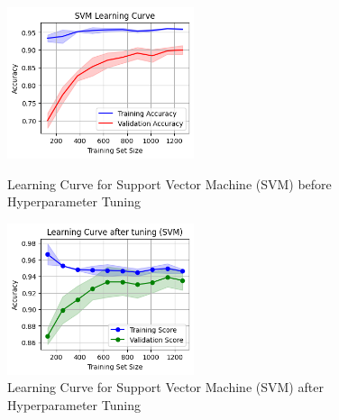 \documentclass[12pt]{report}
\begin{document}
\begin{figure}[H]
	\centering
	\begin{minipage}{0.45\textwidth}
			\centering
			\includegraphics[height=12em]{lc_SVM.png}
			\caption{Learning Curve for Support Vector Machine (SVM) before Hyperparameter Tuning}
			\label{lc_SVM}
	\end{minipage}
	\hfill
	\begin{minipage}{0.45\textwidth}
			\centering
			\includegraphics[height=12em]{lc_tuned_SVM.png}
			\caption{Learning Curve for Support Vector Machine (SVM) after Hyperparameter Tuning}
			\label{lc_tuned_SVM}
	\end{minipage}
\end{figure}
\end{document}
